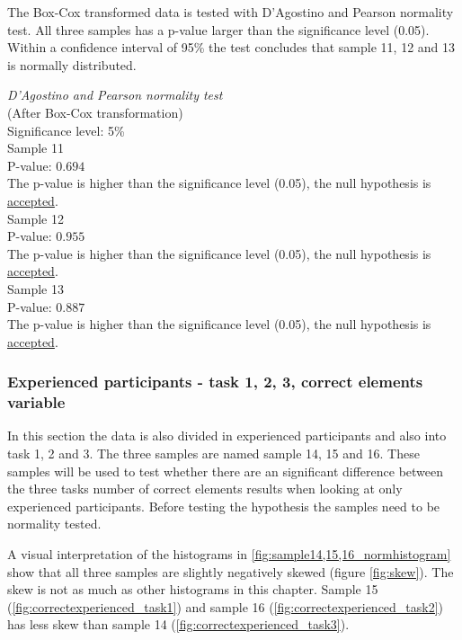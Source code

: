 The Box-Cox transformed data is tested with D'Agostino and Pearson normality test. All three samples has a p-value larger than the significance level (0.05). Within a confidence interval of 95\% the test concludes that sample 11, 12 and 13 is normally distributed.

 \begin{center}
	\begin{tcolorbox}[box align=center,width=\textwidth-5cm]
		\centering
		\textit{D'Agostino and Pearson normality test}\\
		(After Box-Cox transformation) \\
		Significance level: 5\%  \\[0.5cm]
		
		Sample 11 \\
		P-value: $0.694$\\
		The p-value is higher than the significance level (0.05), the null hypothesis is \underline{accepted}. \\[0.5cm]
		
		Sample 12 \\
		P-value: $0.955$ \\
		The p-value is higher than the significance level (0.05), the null hypothesis is \underline{accepted}. \\[0.5cm]
		
		Sample 13 \\
		P-value: $0.887$ \\
		The p-value is higher than the significance level (0.05), the null hypothesis is \underline{accepted}. \\[0.5cm]
	\end{tcolorbox} 
\end{center}

\subsubsection[Sample 14, 15 and 16]{Experienced participants - task 1, 2, 3, correct elements variable}

In this section the data is also divided in experienced participants and also into task 1, 2 and 3. The three samples are named sample 14, 15 and 16. These samples will be used to test whether there are an significant difference between the three tasks number of correct elements results when looking at only experienced participants. Before testing the hypothesis the samples need to be normality tested. 

A visual interpretation of the histograms in \ref{fig:sample14,15,16_normhistogram} show that all three samples are slightly negatively skewed (figure \ref{fig:skew}). The skew is not as much as other histograms in this chapter. Sample 15 (\ref{fig:correctexperienced_task1}) and sample 16 (\ref{fig:correctexperienced_task2}) has less skew than sample 14 (\ref{fig:correctexperienced_task3}).  

